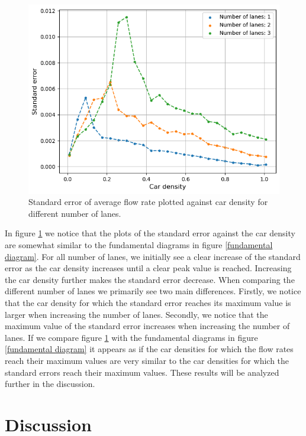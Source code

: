 \documentclass[a4paper,12pt]{article}
\begin{document}
\begin{figure}[H]
    \centering
    \includegraphics[scale=0.9]{Images/standard error 120.png}
    \caption{Standard error of average flow rate plotted against car density for different number of lanes.}
    \label{standard error}
\end{figure}

In figure \ref*{standard error} we notice that the plots of the standard error against the car density are somewhat similar to the fundamental diagrams
in figure \ref*{fundamental diagram}. For all number of lanes, we initially see a clear increase of the standard error as the car density increases
until a clear peak value is reached. Increasing the car density further makes the standard error decrease. When comparing the different number of lanes we primarily
see two main differences. Firstly, we notice that the car density for which the standard error reaches its maximum value is larger when increasing the number of lanes.
Secondly, we notice that the maximum value of the standard error increases when increasing the number of lanes. If we compare figure \ref*{standard error} with the fundamental
diagrams in figure \ref*{fundamental diagram} it appears as if the car densities for which the flow rates reach their maximum
values are very similar to the car densities for which the standard errors reach their maximum values. These results will be analyzed further in the discussion.

\section*{Discussion}
\end{document}
